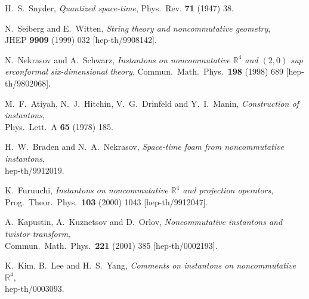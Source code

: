 \documentclass[a4paper,11pt,english]{article}
\numberwithin{equation}{section}
\renewcommand{\=}{\ =\ }
\begin{document}
\begin{thebibliography}{99}

         H.~S.~Snyder,
         {\em Quantized space-time}, %
         Phys.\ Rev. {\bf 71} (1947) 38.

         N.~Seiberg and E.~Witten,
         {\em String theory and noncommutative geometry},\\
         JHEP {\bf 9909} (1999) 032
         [hep-th/9908142].

         N.~Nekrasov and A.~Schwarz,
         {\em Instantons on noncommutative $\mathbb{R}^4$ and $(2,0)$ sup%
erconformal six-dimensional theory},
         Commun.\ Math.\ Phys.\  {\bf 198} (1998) 689
         [hep-th/9802068].

         M.~F.~Atiyah, N.~J.~Hitchin, V.~G.~Drinfeld and Y.~I.~Manin,
         {\em Construction of instantons},\\
         Phys.\ Lett.\ A {\bf 65} (1978) 185.

         H.~W.~Braden and N.~A.~Nekrasov,
         {\em Space-time foam from noncommutative instantons},\\
         hep-th/9912019.

         K.~Furuuchi,
         {\em Instantons on noncommutative $\mathbb{R}^4$ and projection %
operators},\\
         Prog.\ Theor.\ Phys.\  {\bf 103} (2000) 1043
         [hep-th/9912047].

       A.~Kapustin, A.~Kuznetsov and D.~Orlov,
       {\em Noncommutative instantons and twistor transform},\\
       Commun.\ Math.\ Phys.\  {\bf 221} (2001) 385
       [hep-th/0002193].

         K.~Kim, B.~Lee and H.~S.~Yang,
         {\em Comments on instantons on noncommutative $\mathbb{R}^4$},\\
         hep-th/0003093.


\end{thebibliography}
\end{document}
